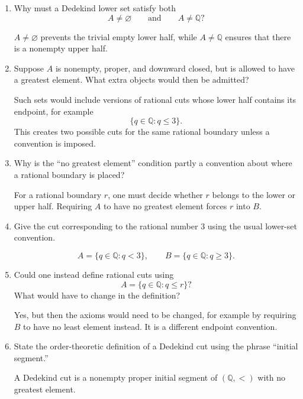 \documentclass{self-check}
\begin{document}
\begin{enumerate}[label=\arabic{*}., itemsep=10pt]
    \begin{answer}
      Yes. If every \(a\in A\) has a strictly larger element of \(A\), then no element can be greatest, and conversely.
    \end{answer}
  \item Why must a Dedekind lower set satisfy both
    \[ A\neq\varnothing \qquad\text{and}\qquad A\neq\mathbb{Q}? \]

    \begin{answer}
      \(A\neq\varnothing\) prevents the trivial empty lower half, while \(A\neq\mathbb{Q}\) ensures that there is a nonempty upper half.
    \end{answer}
  \item Suppose \(A\) is nonempty, proper, and downward closed, but is allowed to have a greatest element. What extra objects would then be admitted?

    \begin{answer}
      Such sets would include versions of rational cuts whose lower half contains its endpoint, for example
      \[ \{q\in\mathbb{Q}:q\le 3\}. \]
      This creates two possible cuts for the same rational boundary unless a convention is imposed.
    \end{answer}
  \item Why is the ``no greatest element'' condition partly a convention about where a rational boundary is placed?

    \begin{answer}
      For a rational boundary \(r\), one must decide whether \(r\) belongs to the lower or upper half. Requiring \(A\) to have no greatest element forces \(r\) into \(B\).
    \end{answer}
  \item Give the cut corresponding to the rational number \(3\) using the usual lower-set convention.

    \begin{answer}
      \[ A=\{q\in\mathbb{Q}:q<3\},\qquad B=\{q\in\mathbb{Q}:q\ge 3\}. \]
    \end{answer}
  \item Could one instead define rational cuts using
    \[ A=\{q\in\mathbb{Q}:q\le r\}? \]
    What would have to change in the definition?

    \begin{answer}
      Yes, but then the axioms would need to be changed, for example by requiring \(B\) to have no least element instead. It is a different endpoint convention.
    \end{answer}
  \item State the order-theoretic definition of a Dedekind cut using the phrase ``initial segment.''

    \begin{answer}
      A Dedekind cut is a nonempty proper initial segment of \((\mathbb{Q},<)\) with no greatest element.
    \end{answer}
\end{enumerate}
\end{document}
